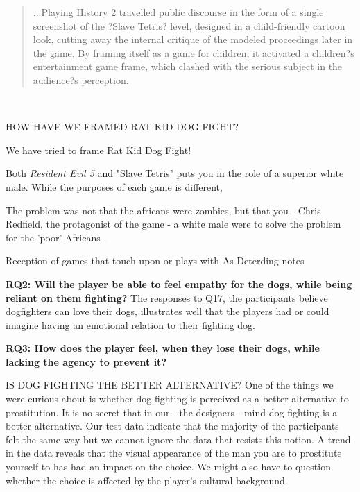\blockquote{...Playing History 2 travelled public discourse in the form of a single screenshot of the ?Slave Tetris? level, designed in a child-friendly cartoon look, cutting away the internal critique of the modeled proceedings later in the game. By framing itself as a game for children, it activated a children?s entertainment game frame, which clashed with the serious subject in the audience?s perception.}\citep{deterding2016mechanic}\

HOW HAVE WE FRAMED RAT KID DOG FIGHT?

We have tried to frame Rat Kid Dog Fight!

Both \textit{Resident Evil 5} and "Slave Tetris" puts you in the role of a superior white male. While the purposes of each game is different, 

The problem was not that the africans were zombies, but that you - Chris Redfield, the protagonist of the game - a white male were to solve the problem for the 'poor' Africans \citep{harrer2015black}. 

Reception of games that touch upon or plays with   As Deterding \citeyear{deterding2016mechanic} notes




\textbf{RQ2:  Will the player be able to feel empathy for the dogs, while being reliant on them fighting?}
The responses to Q17, the participants believe dogfighters can love their dogs, illustrates well that the players had or could imagine having an emotional relation to their fighting dog. 



\textbf{RQ3: How does the player feel, when they lose their dogs, while lacking the agency to prevent it?}








IS DOG FIGHTING THE BETTER ALTERNATIVE?
One of the things we were curious about is whether dog fighting is perceived as a better alternative to prostitution. It is no secret that in our - the designers - mind dog fighting is a better alternative. Our test data indicate that the majority of the participants felt the same way but we cannot ignore the data that resists this notion. A trend in the data reveals that the visual appearance of the man you are to prostitute yourself to has had an impact on the choice. We might also have to question whether the choice is affected by the player's cultural background.

